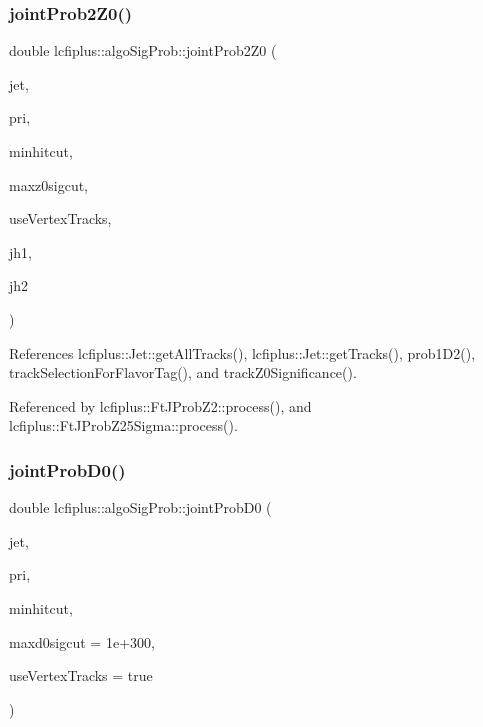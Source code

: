 \subsubsection{joint\+Prob2\+Z0()}
{\footnotesize\ttfamily double lcfiplus\+::algo\+Sig\+Prob\+::joint\+Prob2\+Z0 (\begin{DoxyParamCaption}\item[{const \textbf{ Jet} $\ast$}]{jet,  }\item[{const \textbf{ Vertex} $\ast$}]{pri,  }\item[{int}]{minhitcut,  }\item[{double}]{maxz0sigcut,  }\item[{bool}]{use\+Vertex\+Tracks,  }\item[{const T\+H1 $\ast$}]{jh1,  }\item[{const T\+H1 $\ast$}]{jh2 }\end{DoxyParamCaption})}



References lcfiplus\+::\+Jet\+::get\+All\+Tracks(), lcfiplus\+::\+Jet\+::get\+Tracks(), prob1\+D2(), track\+Selection\+For\+Flavor\+Tag(), and track\+Z0\+Significance().



Referenced by lcfiplus\+::\+Ft\+J\+Prob\+Z2\+::process(), and lcfiplus\+::\+Ft\+J\+Prob\+Z25\+Sigma\+::process().

\mbox{\label{namespacelcfiplus_1_1algoSigProb_add58bf3f73d50d6da3cc6fcf0edda938}} 
\subsubsection{joint\+Prob\+D0()}
{\footnotesize\ttfamily double lcfiplus\+::algo\+Sig\+Prob\+::joint\+Prob\+D0 (\begin{DoxyParamCaption}\item[{const \textbf{ Jet} $\ast$}]{jet,  }\item[{const \textbf{ Vertex} $\ast$}]{pri,  }\item[{int}]{minhitcut,  }\item[{double}]{maxd0sigcut = {\ttfamily 1e+300},  }\item[{bool}]{use\+Vertex\+Tracks = {\ttfamily true} }\end{DoxyParamCaption})}



